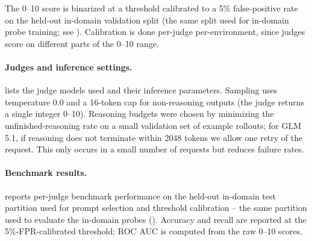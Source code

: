 \documentclass{article}
\begin{document}
The 0--10 score is binarized at a threshold calibrated to a 5\% false-positive rate on the held-out in-domain validation split (the same split used for in-domain probe training; see ). Calibration is done per-judge per-environment, since judges score on different parts of the 0--10 range.

\paragraph{Judges and inference settings.}  lists the judge models used and their inference parameters. Sampling uses temperature 0.0 and a 16-token cap for non-reasoning outputs (the judge returns a single integer 0--10). Reasoning budgets were chosen by minimizing the unfinished-reasoning rate on a small validation set of example rollouts; for GLM 5.1, if reasoning does not terminate within 2048 tokens we allow one retry of the request. This only occurs in a small number of requests but reduces failure rates.

\begin{table}[h]
\centering
\small
{}
\vspace{0.5em}
\caption{Judge inference settings. Sampling: temperature 0.0, max 16 new tokens. Qwen3-235B, Kimi K2.5, DeepSeek V4 Flash, and GLM 5.1 are used across the judge baselines and comparisons; selected judge identities and thresholds vary by environment.}
\label{tab:judge_inference}
\end{table}

\paragraph{Benchmark results.}  reports per-judge benchmark performance on the held-out in-domain test partition used for prompt selection and threshold calibration -- the same partition used to evaluate the in-domain probes (). Accuracy and recall are reported at the 5\%-FPR-calibrated threshold; ROC AUC is computed from the raw 0--10 scores.
\end{document}

